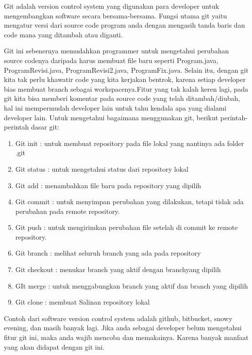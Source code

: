 \documentclass[12pt,a4paper]{article}
\begin{document}
Git adalah version control system yang digunakan para developer untuk 
mengembangkan software secara bersama-bersama. Fungsi utama git yaitu 
mengatur versi dari source code program anda dengan mengasih tanda baris 
dan code mana yang ditambah atau diganti.
\vspace{12pt}

Git ini sebenernya memudahkan programmer untuk mengetahui perubahan 
source codenya daripada harus membuat file baru seperti Program.java, 
ProgramRevisi.java, ProgramRevisi2.java, ProgramFix.java. Selain itu, 
dengan git kita tak perlu khawatir code yang kita kerjakan bentrok, 
karena setiap developer bias membuat branch sebagai workspacenya.Fitur 
yang tak kalah keren lagi, pada git kita bisa memberi komentar pada 
source code yang telah ditambah/diubah, hal ini mempermudah developer 
lain untuk tahu kendala apa yang dialami developer lain.
\vspace{12pt}
Untuk mengetahui bagaimana menggunakan git, berikut perintah-perintah 
dasar git:

\begin{enumerate}
\item Git init : untuk membuat repository pada file lokal yang nantinya 
ada folder .git
\item Git status : untuk mengetahui status dari repository lokal
\item Git add : menambahkan file baru pada repository yang dipilih
\item Git commit : untuk menyimpan perubahan yang dilakukan, tetapi 
tidak ada perubahan pada remote repository.
\item Git push : untuk mengirimkan perubahan file setelah di commit ke 
remote repository.
\item Git branch : melihat seluruh branch yang ada pada repository
\item Git checkout : menukar branch yang aktif dengan branchyang dipilih
\item GIt merge : untuk menggabungkan branch yang aktif dan branch yang 
dipilih
\item Git clone : membuat Salinan repository lokal
\setcounter{numberedCntE}{\theenumi}
\end{enumerate}
Contoh dari software version control system adalah github, bitbucket, 
snowy evening, dan masih banyak lagi. Jika anda sebagai developer belum 
mengetahui fitur git ini, maka anda wajib mencoba dan memakainya. Karena 
banyak manfaat yang akan didapat dengan git ini.
\vspace{12pt}
\end{document}
